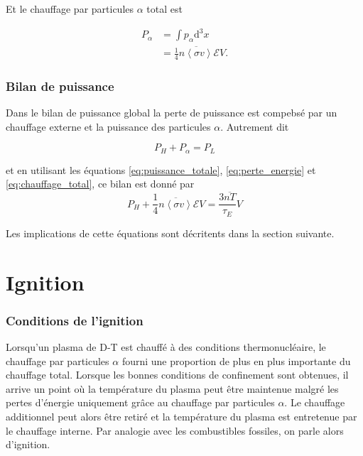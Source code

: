 \documentclass[main.tex]{subfiles}
\begin{document}
Et le chauffage par particules \( \alpha \) total est

\begin{align}
	P_\alpha &= \int p_\alpha \text{d}^3 x\nonumber \\
	&= \frac{1}{4} \overline{n  \left\langle \sigma v \right\rangle }\mathscr{E} V.
	\label{eq:chauffage_total}
\end{align}

\subsubsection*{Bilan de puissance}

Dans le bilan de puissance global la perte de puissance est compebsé par un chauffage externe et la puissance des particules \( \alpha \). Autrement dit

\[
	P_H + P_\alpha = P_L
\]

et en utilisant les équations \ref{eq:puissance_totale}, \ref{eq:perte_energie} et \ref{eq:chauffage_total}, ce bilan est donné par 
\begin{equation}
	P_H + \frac{1}{4} \overline{n  \left\langle \sigma v \right\rangle }\mathscr{E} V = \frac{3 \overline{n T}}{\tau_E} V 
	\label{eq:puissance_chauffage_moyenne}
\end{equation}

Les implications de cette équations sont décritents dans la section suivante.

\section{Ignition}
\label{sec:ignition}

\subsubsection*{Conditions de l'ignition}

Lorsqu'un plasma de D-T est chauffé à des conditions thermonucléaire, le chauffage par particules \( \alpha \) fourni une proportion de plus en plus importante du chauffage total.
Lorsque les bonnes conditions de confinement sont obtenues, il arrive un point où la température du plasma peut être maintenue malgré les pertes d'énergie uniquement  grâce au chauffage par particules \( \alpha \).
Le chauffage additionnel peut alors être retiré et la température du plasma est entretenue par le chauffage interne.
Par analogie avec les combustibles fossiles, on parle alors d’ignition.
\end{document}
